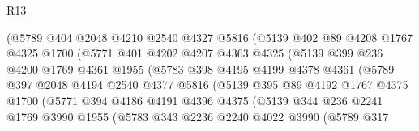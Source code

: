 \begin{lexlean}{R13}
\begin{coremodule}
                      (@5789
                        @404
                        @2048
                        @4210
                        @2540
                        @4327
                        @5816
                        (@5139
                          @402
                          @89
                          @4208
                          @1767
                          @4325
                          @1700
                          (@5771
                            @401
                            @4202
                            @4207
                            @4363
                            @4325
                            (@5139
                              @399
                              @236
                              @4200
                              @1769
                              @4361
                              @1955
                              (@5783
                                @398
                                @4195
                                @4199
                                @4378
                                @4361
                                (@5789
                                  @397
                                  @2048
                                  @4194
                                  @2540
                                  @4377
                                  @5816
                                  (@5139
                                    @395
                                    @89
                                    @4192
                                    @1767
                                    @4375
                                    @1700
                                    (@5771
                                      @394
                                      @4186
                                      @4191
                                      @4396
                                      @4375
                                      (@5139
                                        @344
                                        @236
                                        @2241
                                        @1769
                                        @3990
                                        @1955
                                        (@5783
                                          @343
                                          @2236
                                          @2240
                                          @4022
                                          @3990
                                          (@5789
                                            @317

\end{coremodule}
\end{lexlean}
